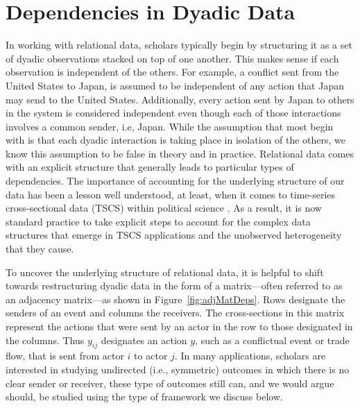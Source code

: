\section{\textbf{Dependencies in Dyadic Data}}

In working with relational data, scholars typically begin by structuring it as a set of dyadic observations stacked on top of one another. This makes sense if each observation is independent of the others. For example, a conflict sent from the United States to Japan, is assumed to be independent of any action that Japan may send to the United States. Additionally, every action sent by Japan to others in the system is considered independent even though each of those interactions involves a common sender, i.e, Japan. While the assumption that most begin with is that each dyadic interaction is taking place in isolation of the others, we know this assumption to be false in theory and in practice. Relational data comes with an explicit structure that generally leads to particular types of dependencies. The importance of accounting for the underlying structure of our data has been a lesson well understood, at least, when it comes to time-series cross-sectional data (TSCS) within political science \citep{beck:katz:1995,beck:etal:1998}. As a result, it is now standard practice to take explicit steps to account for the complex data structures that emerge in TSCS applications and the unobserved heterogeneity that they cause. 

To uncover the underlying structure of relational data, it is helpful to shift towards restructuring dyadic data in the form of a matrix---often referred to as an adjacency matrix---as shown in Figure~\ref{fig:adjMatDeps}. Rows designate the senders of an event and columns the receivers. The cross-sections in this matrix represent the actions that were sent by an actor in the row to those designated in the columns. Thus $y_{ij}$ designates an action $y$, such as a conflictual event or trade flow, that is sent from actor $i$ to actor $j$. In many applications, scholars are interested in studying undirected (i.e., symmetric) outcomes in which there is no clear sender or receiver, these type of outcomes still can, and we would argue should, be studied using the type of framework we discuss below.

